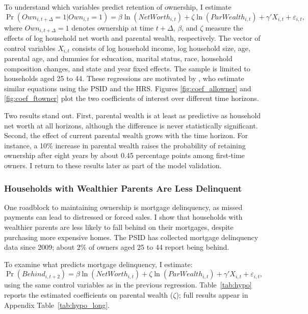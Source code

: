 \documentclass[12pt]{article}
\begin{document}
To understand which variables predict retention of ownership, I estimate
\begin{equation}	\label{eq:regmaintain}
	\Pr\left(Own_{i,t+\Delta}=1|Own_{i,t}=1\right)
	= \beta\ln(NetWorth_{i,t}) + \zeta\ln(ParWealth_{i,t})
	  + \gamma' X_{i,t} + \varepsilon_{i,t},
\end{equation}
where $Own_{i,t+\Delta}=1$ denotes ownership at time $t+\Delta$, $\beta$, and $\zeta$ measure the effects of log household net worth and parental wealth, respectively. The vector of control variables  $X_{i,t}$ consists of log household income, log household size, age, parental age, and dummies for  education, marital status, race, household composition changes, and state and year fixed effects.  The sample is limited to households aged 25 to 44. These regressions are motivated by \cite{bond2021role}, who estimate similar equations using the PSID and the HRS. Figures \ref{fig:coef_allowner} and \ref{fig:coef_ftowner} plot the two coefficients of interest over different time horizons.

Two results stand out. First, parental wealth is at least as predictive as household net worth at all horizons, although the difference is never statistically significant. Second, the effect of current parental wealth grows with the time horizon. For instance, a 10\% increase in parental wealth raises the probability of retaining ownership after eight years by about 0.45 percentage points among first-time owners. I return to these results later as part of the model validation.


\subsubsection{Households with Wealthier Parents Are Less Delinquent} 
One roadblock to maintaining ownership is mortgage delinquency, as missed payments can lead to distressed or forced sales. I show that households with wealthier parents are less likely to fall behind on their mortgages, despite purchasing more expensive homes. The PSID has collected mortgage delinquency data since 2009; about 2\% of owners aged 25 to 44 report being behind.

To examine what predicts mortgage delinquency, I estimate: 
\begin{equation}\label{eq:regbehind}
\Pr(Behind_{i,t+2}) = \beta\ln(NetWorth_{i,t}) + \zeta\ln(ParWealth_{i,t}) + \gamma' X_{i,t} + \varepsilon_{i,t},
\end{equation}
using the same control variables as in the previous regression. Table~\ref{tab:hypo} reports the estimated coefficients on parental wealth ($\zeta$); full results appear in Appendix Table~\ref{tab:hypo_long}.  
\end{document}
